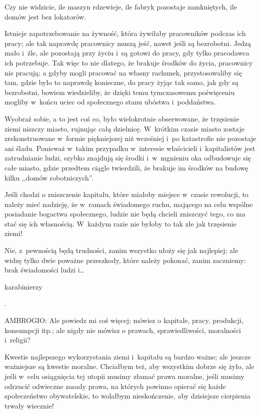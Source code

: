 \documentclass[oneside,polish,11pt,sfheadings]{mwbk}
\begin{document}
 
Czy nie widzicie, ile maszyn rdzewieje, ile fabryk pozostaje zamkniętych, ile domów jest bez lokatorów. 

 
Istnieje zapotrzebowanie na żywność, która żywiłaby pracowników podczas ich pracy; ale tak naprawdę pracownicy muszą
jeść, nawet jeśli są bezrobotni. Jedzą mało i~źle, ale pozostają przy życiu i~są gotowi do pracy, gdy tylko pracodawca
ich potrzebuje. Tak więc to nie dlatego, że brakuje środków do życia, pracownicy nie pracują; a gdyby mogli pracować na
własny rachunek, przystosowaliby się tam, gdzie było to naprawdę konieczne, do pracy żyjąc tak samo, jak gdy są
bezrobotni, bowiem wiedzieliby, że dzięki temu tymczasowemu poświęceniu mogliby w~końcu uciec od społecznego stanu
ubóstwa i~poddaństwa. 

 
Wyobraź sobie, a to jest coś co, było wielokrotnie obserwowane, że trzęsienie ziemi niszczy miasto, rujnując całą
dzielnicę. W~krótkim czasie miasto zostaje zrekonstruowane w~formie piękniejszej niż wcześniej i~po katastrofie nie
pozostaje ani śladu. Ponieważ w~takim przypadku w~interesie właścicieli i~kapitalistów jest zatrudnianie ludzi, szybko
znajdują się środki i~w~mgnieniu oka odbudowuje się całe miasto, gdzie przedtem ciągle twierdzili, że brakuje im
środków na budowę kilku ,,domów robotniczych''. 

 
Jeśli chodzi o zniszczenie kapitału, które miałoby miejsce w~czasie rewolucji, to należy mieć nadzieję, że w~ramach
świadomego ruchu, mającego na celu wspólne posiadanie bogactwa społecznego, ludzie nie będą chcieli zniszczyć tego, co
ma stać się ich własnością. W~każdym razie nie byłoby to tak złe jak trzęsienie ziemi! 

 
Nie, z~pewnością będą trudności, zanim wszystko ułoży się jak najlepiej; ale widzę tylko dwie poważne przeszkody, które
należy pokonać, zanim zaczniemy: brak świadomości ludzi
i\ldots\begin{itshape}karabinierzy \end{itshape}. 




 
\noindent AMBROGIO: Ale powiedz mi coś więcej; mówisz o kapitale, pracy, produkcji, konsumpcji itp.; ale nigdy nie mówisz o
prawach, sprawiedliwości, moralności i~religii? 

 
Kwestie najlepszego wykorzystania ziemi i~kapitału są bardzo ważne; ale jeszcze ważniejsze są kwestie moralne. Chciałbym
też, aby wszystkim dobrze się żyło, ale jeśli w~celu osiągnięcia tej utopii musimy złamać prawa moralne, jeśli musimy
odrzucić odwieczne zasady prawa, na których powinno opierać się każde społeczeństwo obywatelskie, to wolałbym
nieskończenie, aby dzisiejsze cierpienia trwały wiecznie! 
\end{document}
